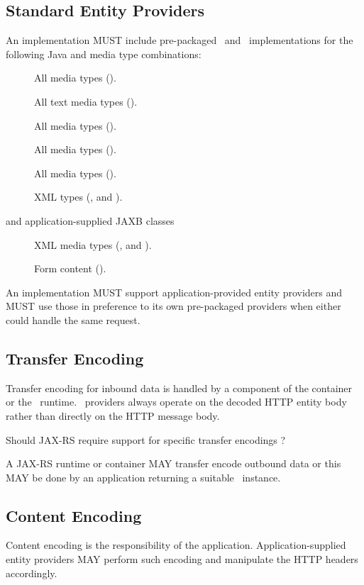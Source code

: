 \subsection{Standard Entity Providers}
\label{standard_entity_providers}

An implementation MUST include pre-packaged \MsgRead\ and \MsgWrite\ implementations for the following Java and media type combinations:

\begin{description}
\item[] All media types (\code{*/*}).
\item[] All text media types ().
\item[] All media types (\code{*/*}).
\item[] All media types (\code{*/*}).
\item[] All media types (\code{*/*}).
\item[] XML types (,  and ).
\item[ and application-supplied JAXB classes] XML media types (,  and ).
\item[] Form content ().
\end{description}

An implementation MUST support application-provided entity providers and MUST use those in preference to its own pre-packaged providers when either could handle the same request.

\subsection{Transfer Encoding}

Transfer encoding for inbound data is handled by a component of the container or the \jaxrs\ runtime. \MsgRead\ providers always operate on the decoded HTTP entity body rather than directly on the HTTP message body.

\begin{ednote}Should JAX-RS require support for specific transfer encodings ?\end{ednote}

A JAX-RS runtime or container MAY transfer encode outbound data or this MAY be done by an application returning a suitable \Response\ instance.

\subsection{Content Encoding}

Content encoding is the responsibility of the application. Application-supplied entity providers MAY perform such encoding and manipulate the HTTP headers accordingly.
